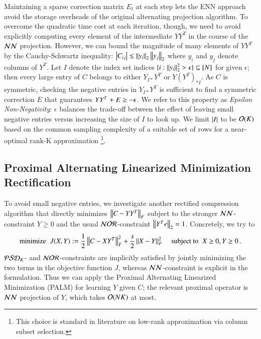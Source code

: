 Maintaining a sparse correction matrix $E_t$ at each step lets the ENN approach
avoid the storage overheads of the original alternating projection algorithm. 
To overcome the quadratic time cost at each iteration, though, we need to avoid
explicitly computing every element of the intermediate $Y Y^T$ in the course of
the $\mathcal{NN}$ projection. However, we can bound the magnitude of many elements of
$YY^T$ by the Cauchy\hyp{}Schwartz inequality: $\left\lvert C_{ij}\right\rvert \leq \left\lVert y_i\right\rVert_2 
\left\lVert y_j\right\rVert_2$ where $y_i$ and $y_j$ denote columns of $Y^T$. Let $I$ denote the
index set indices $\{i :\left\lVert y_i\right\rVert^2_2 > \epsilon\} \subseteq [N]$ for given
$\epsilon$; then every large entry of $C$ belongs to either $Y_{I*}Y^T$ or $Y
(Y^T)_{*I}$. As $C$ is symmetric, checking the negative entries in $Y_{I*}Y^T$
is sufficient to find a symmetric correction $E$ that guarantees $YY^T \mathrel{+} E
\geq -\epsilon$. We refer to this property as \textit{Epsilon
Non\hyp{}Negativity}: $\epsilon$ balances the trade\hyp{}off between the effect
of leaving small negative entries versus increasing the size of $I$ to look up.
We limit $\left\lvert I\right\rvert$ to be $\mathcal{O}(K)$ based on the common sampling complexity of a
suitable set of rows for a near\hyp{}optimal rank\hyp{}K approximation
\footnote{This choice is standard in literature on low\hyp{}rank approximation
via column subset selection.}.

\subsection{Proximal Alternating Linearized Minimization Rectification}

To avoid small negative entries, we investigate another rectified compression
algorithm that directly minimizes $\left\lVert C - Y Y^T\right\rVert_F$ subject to the stronger
$\mathcal{NN}$\hyp{}constraint $Y \geq 0$ and the usual $\mathcal{NOR}$\hyp{}constraint
$\left\lVert Y^Te\right\rVert_2 \mathrel{=} 1$. Concretely, we try to
\begin{equation}
  \text{minimize} \;\; J(X, Y) := \frac{1}{2} \left\lVert C - XY^T\right\rVert_F^2 + \frac{s}{2}
  \left\lVert X - Y\right\rVert_F^2 \;\;\;\; \text{subject to} \;\; X \geq 0, Y \geq 0\,. 
  \label{eqn:palm}
\end{equation}
$\mathcal{PSD}_K$- and $\mathcal{NOR}$-constraints are implicitly satisfied by jointly minimizing
the two terms in the objective function $J$, whereas $\mathcal{NN}$\hyp{}constraint is
explicit in the formulation. Thus we can apply the Proximal Alternating
Linearized Minimization (PALM)\cite{bolte2014proximal} for learning $Y$ given
$C$; the relevant proximal operator is $\mathcal{NN}$ projection of $Y$, which takes
$\mathcal{O}(NK)$ at most.

